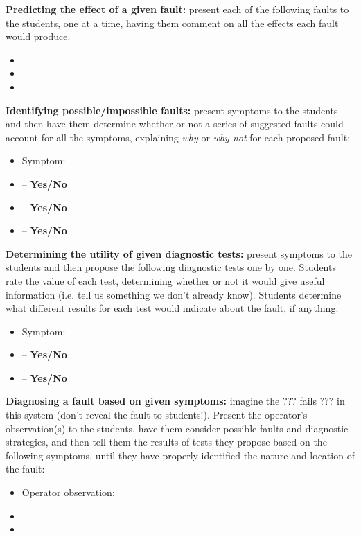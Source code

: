 \noindent
{\bf Predicting the effect of a given fault:} present each of the following faults to the students, one at a time, having them comment on all the effects each fault would produce.

\begin{itemize}
\item{} 
\item{} 
\item{} 
\end{itemize}


\vskip 10pt


\noindent
{\bf Identifying possible/impossible faults:} present symptoms to the students and then have them determine whether or not a series of suggested faults could account for all the symptoms, explaining {\it why} or {\it why not} for each proposed fault:

\begin{itemize}
\item{} Symptom: {\it }
\item{}  -- {\bf Yes/No}
\item{}  -- {\bf Yes/No}
\item{}  -- {\bf Yes/No}
\end{itemize}


\vskip 10pt


\noindent
{\bf Determining the utility of given diagnostic tests:} present symptoms to the students and then propose the following diagnostic tests one by one.  Students rate the value of each test, determining whether or not it would give useful information (i.e. tell us something we don't already know).  Students determine what different results for each test would indicate about the fault, if anything:

\begin{itemize}
\item{} Symptom: {\it }
\item{}  -- {\bf Yes/No}
\item{}  -- {\bf Yes/No}
\end{itemize}


\vskip 10pt


\noindent
{\bf Diagnosing a fault based on given symptoms:} imagine the ??? fails ??? in this system (don't reveal the fault to students!).  Present the operator's observation(s) to the students, have them consider possible faults and diagnostic strategies, and then tell them the results of tests they propose based on the following symptoms, until they have properly identified the nature and location of the fault:

\begin{itemize}
\item{} Operator observation: {\it }
\item{} 
\item{} 
\end{itemize}




